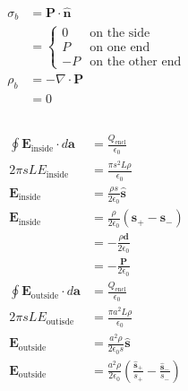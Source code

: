 \documentclass{article}
\renewcommand{\vec}[1]{\boldsymbol{\mathbf{#1}}}
\newcommand{\uvec}[1]{\hat{\vec{#1}}}
\begin{document}
\subsection{}

\begin{align*}
  \sigma_b & = \vec{P} \cdot \uvec{n}       \\
           & = \begin{cases}
                 0  & \text{on the side}      \\
                 P  & \text{on one end}       \\
                 -P & \text{on the other end}
               \end{cases} \\
  \rho_b   & = -\nabla \cdot \vec{P}        \\
           & = 0
\end{align*}

\setcounter{subsection}{12}
\subsection{}

\begin{align*}
  \oint \vec{E}_\text{inside} \cdot d \vec{a}  & = \frac{Q_\text{encl}}{\epsilon_0}                                                             \\
  2 \pi s L E_\text{inside}                    & = \frac{\pi s^2 L \rho}{\epsilon_0}                                                            \\
  \vec{E}_\text{inside}                        & = \frac{\rho s}{2 \epsilon_0} \uvec{s}                                                         \\
  \vec{E}_\text{inside}                        & = \frac{\rho}{2 \epsilon_0} (\vec{s}_+ - \vec{s}_-)                                            \\
                                               & = -\frac{\rho \vec{d}}{2 \epsilon_0}                                                           \\
                                               & = -\frac{\vec{P}}{2 \epsilon_0}                                                                \\
  \oint \vec{E}_\text{outside} \cdot d \vec{a} & = \frac{Q_\text{encl}}{\epsilon_0}                                                             \\
  2 \pi s L E_\text{outisde}                   & = \frac{\pi a^2 L \rho}{\epsilon_0}                                                            \\
  \vec{E}_\text{outside}                       & = \frac{a^2 \rho}{2 \epsilon_0 s} \uvec{s}                                                     \\
  \vec{E}_\text{outside}                       & = \frac{a^2 \rho}{2 \epsilon_0} \left( \frac{\uvec{s}_+}{s_+} - \frac{\uvec{s}_-}{s_-} \right)
\end{align*}
\end{document}
